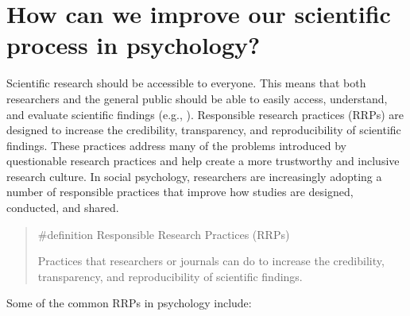 \documentclass[
  letterpaper,
]{book}
\begin{document}
\section*{How can we improve our scientific process in
psychology?}\label{how-can-we-improve-our-scientific-process-in-psychology}


Scientific research should be accessible to everyone. This means that
both researchers and the general public should be able to easily access,
understand, and evaluate scientific findings (e.g.,
).
Responsible research practices (RRPs) are designed to increase the
credibility, transparency, and reproducibility of scientific findings.
These practices address many of the problems introduced by questionable
research practices and help create a more trustworthy and inclusive
research culture. In social psychology, researchers are increasingly
adopting a number of responsible practices that improve how studies are
designed, conducted, and shared.

\begin{quote}
\label{def-responsibleresearchpractices}{\#definition}
Responsible Research Practices (RRPs)

Practices that researchers or journals can do to increase the
credibility, transparency, and reproducibility of scientific findings.
\end{quote}

Some of the common RRPs in psychology include:
\end{document}
